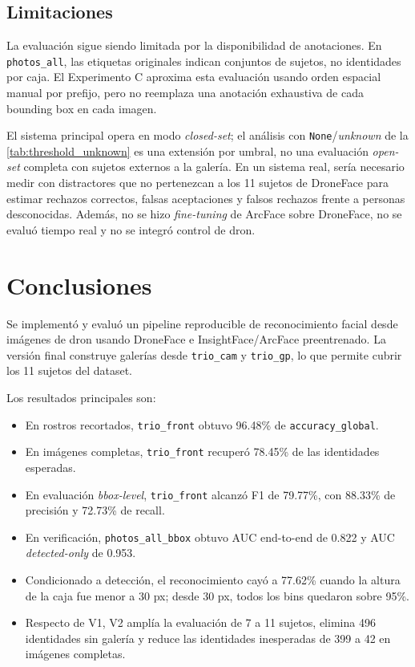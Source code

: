 \documentclass[11pt]{article}
\newcommand{\accglobal}{\texttt{accuracy\_global}}
\begin{document}
\subsection{Limitaciones}

La evaluaci\'on sigue siendo limitada por la disponibilidad de anotaciones. En \texttt{photos\_all}, las etiquetas originales indican conjuntos de sujetos, no identidades por caja. El Experimento C aproxima esta evaluaci\'on usando orden espacial manual por prefijo, pero no reemplaza una anotaci\'on exhaustiva de cada bounding box en cada imagen.

El sistema principal opera en modo \textit{closed-set}; el an\'alisis con \texttt{None}/\textit{unknown} de la \autoref{tab:threshold_unknown} es una extensi\'on por umbral, no una evaluaci\'on \textit{open-set} completa con sujetos externos a la galer\'ia. En un sistema real, ser\'ia necesario medir con distractores que no pertenezcan a los 11 sujetos de DroneFace para estimar rechazos correctos, falsas aceptaciones y falsos rechazos frente a personas desconocidas. Adem\'as, no se hizo \textit{fine-tuning} de ArcFace sobre DroneFace, no se evalu\'o tiempo real y no se integr\'o control de dron.

\section{Conclusiones}
\label{sec:conclusiones}

Se implement\'o y evalu\'o un pipeline reproducible de reconocimiento facial desde im\'agenes de dron usando DroneFace e InsightFace/ArcFace preentrenado. La versi\'on final construye galer\'ias desde \texttt{trio\_cam} y \texttt{trio\_gp}, lo que permite cubrir los 11 sujetos del dataset.

Los resultados principales son:

\begin{itemize}
    \item En rostros recortados, \texttt{trio\_front} obtuvo 96.48\% de \accglobal{}.
    \item En im\'agenes completas, \texttt{trio\_front} recuper\'o 78.45\% de las identidades esperadas.
    \item En evaluaci\'on \textit{bbox-level}, \texttt{trio\_front} alcanz\'o F1 de 79.77\%, con 88.33\% de precisi\'on y 72.73\% de recall.
    \item En verificaci\'on, \texttt{photos\_all\_bbox} obtuvo AUC end-to-end de 0.822 y AUC \textit{detected-only} de 0.953.
    \item Condicionado a detecci\'on, el reconocimiento cay\'o a 77.62\% cuando la altura de la caja fue menor a 30 px; desde 30 px, todos los bins quedaron sobre 95\%.
    \item Respecto de V1, V2 ampl\'ia la evaluaci\'on de 7 a 11 sujetos, elimina 496 identidades sin galer\'ia y reduce las identidades inesperadas de 399 a 42 en im\'agenes completas.
\end{itemize}
\end{document}

